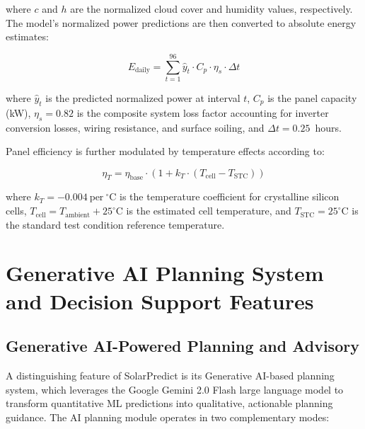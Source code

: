 \documentclass[conference]{IEEEtran}
\begin{document}
where $c$ and $h$ are the normalized cloud cover and humidity values, respectively. The model's normalized power predictions are then converted to absolute energy estimates:

\begin{equation}
E_{\text{daily}} = \sum_{t=1}^{96} \hat{y}_t \cdot C_p \cdot \eta_s \cdot \Delta t
\label{eq:energy}
\end{equation}

where $\hat{y}_t$ is the predicted normalized power at interval $t$, $C_p$ is the panel capacity (kW), $\eta_s = 0.82$ is the composite system loss factor accounting for inverter conversion losses, wiring resistance, and surface soiling, and $\Delta t = 0.25$~hours.

Panel efficiency is further modulated by temperature effects according to:

\begin{equation}
\eta_T = \eta_{\text{base}} \cdot \left(1 + k_T \cdot (T_{\text{cell}} - T_{\text{STC}})\right)
\label{eq:temp}
\end{equation}

where $k_T = -0.004~\text{per}~^\circ\text{C}$ is the temperature coefficient for crystalline silicon cells, $T_{\text{cell}} = T_{\text{ambient}} + 25^\circ\text{C}$ is the estimated cell temperature, and $T_{\text{STC}} = 25^\circ\text{C}$ is the standard test condition reference temperature.

\section{Generative AI Planning System and Decision Support Features}

\subsection{Generative AI-Powered Planning and Advisory}

A distinguishing feature of SolarPredict is its Generative AI-based planning system, which leverages the Google Gemini 2.0 Flash large language model to transform quantitative ML predictions into qualitative, actionable planning guidance. The AI planning module operates in two complementary modes:
\end{document}
